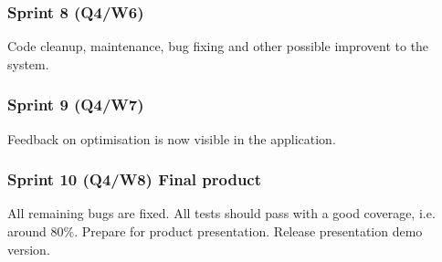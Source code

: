 \documentclass[10pt,a4paper]{report}
\begin{document}
			\subsubsection*{Sprint 8 (Q4/W6)}
				Code cleanup, maintenance, bug fixing and other possible improvent to the system.
			\subsubsection*{Sprint 9 (Q4/W7)}
				Feedback on optimisation is now visible in the application. 
			\subsubsection*{Sprint 10 (Q4/W8) Final product}
				All remaining bugs are fixed. All tests should pass with a good coverage, i.e. around 80\%. Prepare for product presentation. Release presentation demo version.

	\clearpage
\end{document}
